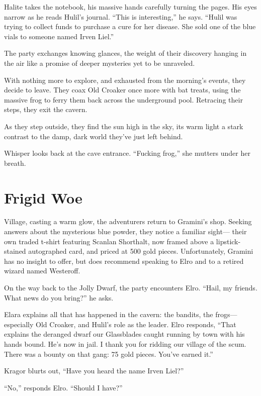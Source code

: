 \documentclass[
  letterpaper,12pt,twoside,twocolumn,openany,
  nodeprecatedcode,bg=full]{dndbook}
\begin{document}
Halite takes the notebook, his massive hands carefully turning the
pages. His eyes narrow as he reads Hulil's journal. ``This is
interesting,'' he says. ``Hulil was trying to collect funds to purchase
a cure for her disease. She sold one of the blue vials to someone named
Irven Liel.''

The party exchanges knowing glances, the weight of their discovery
hanging in the air like a promise of deeper mysteries yet to be
unraveled.

With nothing more to explore, and exhausted from the morning's events,
they decide to leave. They coax Old Croaker once more with bat treats,
using the massive frog to ferry them back across the underground pool.
Retracing their steps, they exit the cavern.

As they step outside, they find the sun high in the sky, its warm light
a stark contrast to the damp, dark world they've just left behind.

Whisper looks back at the cave entrance. ``Fucking frog,'' she mutters
under her breath.

\chapter{Frigid Woe}\label{frigid-woe}

 Village, casting a warm
glow, the adventurers return to Gramini's shop. Seeking answers about
the mysterious blue powder, they notice a familiar sight--- their own
traded t-shirt featuring Scanlan Shorthalt, now framed above a
lipstick-stained autographed card, and priced at 500 gold pieces.
Unfortunately, Gramini has no insight to offer, but does recommend
speaking to Elro and to a retired wizard named Westeroff.

On the way back to the Jolly Dwarf, the party encounters Elro. ``Hail,
my friends. What news do you bring?'' he asks.

Elara explains all that has happened in the cavern: the bandits, the
frogs--- especially Old Croaker, and Hulil's role as the leader. Elro
responds, ``That explains the deranged dwarf our Glassblades caught
running by town with his hands bound. He's now in jail. I thank you for
ridding our village of the scum. There was a bounty on that gang: 75
gold pieces. You've earned it.''

Kragor blurts out, ``Have you heard the name Irven Liel?''

``No,'' responds Elro. ``Should I have?''
\end{document}
